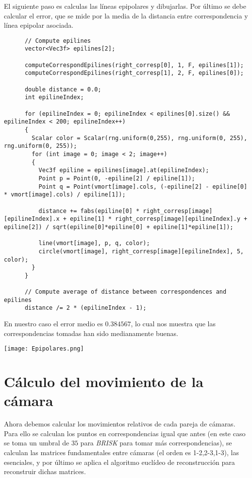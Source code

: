 \documentclass[a4paper, 11pt]{article}
\theoremstyle{definition}
\begin{document}
    El siguiente paso es calculas las líneas epipolares y dibujarlas. Por último
    se debe calcular el error, que se mide por la media de la distancia entre correspondencia
    y línea epipolar asociada.

    \begin{lstlisting}
      // Compute epilines
      vector<Vec3f> epilines[2];

      computeCorrespondEpilines(right_corresp[0], 1, F, epilines[1]);
      computeCorrespondEpilines(right_corresp[1], 2, F, epilines[0]);

      double distance = 0.0;
      int epilineIndex;

      for (epilineIndex = 0; epilineIndex < epilines[0].size() && epilineIndex < 200; epilineIndex++)
      {
        Scalar color = Scalar(rng.uniform(0,255), rng.uniform(0, 255), rng.uniform(0, 255));
        for (int image = 0; image < 2; image++)
        {
          Vec3f epiline = epilines[image].at(epilineIndex);
          Point p = Point(0, -epiline[2] / epiline[1]);
          Point q = Point(vmort[image].cols, (-epiline[2] - epiline[0] * vmort[image].cols) / epiline[1]);

          distance += fabs(epiline[0] * right_corresp[image][epilineIndex].x + epiline[1] * right_corresp[image][epilineIndex].y + epiline[2]) / sqrt(epiline[0]*epiline[0] + epiline[1]*epiline[1]);

          line(vmort[image], p, q, color);
          circle(vmort[image], right_corresp[image][epilineIndex], 5, color);
        }
      }

      // Compute average of distance between correspondences and epilines
      distance /= 2 * (epilineIndex - 1);

    \end{lstlisting}

    En nuestro caso el error medio es $0.384567$, lo cual nos muestra que las correspondencias
    tomadas han sido medianamente buenas.\\

    \centerline{\texttt{[image: Epipolares.png]}}

    \section{Cálculo del movimiento de la cámara}

      Ahora debemos calcular los movimientos relativos de cada pareja de cámaras.
      Para ello se calculan los puntos en correspondencias igual que antes (en este caso se toma
      un umbral de $35$ para \emph{BRISK} para tomar más correspondencias),
      se calculan las matrices fundamentales entre cámaras (el orden es 1-2,2-3,1-3), las esenciales, y por último
      se aplica el algoritmo euclídeo de reconstrucción para reconstruir dichas matrices.
\end{document}
